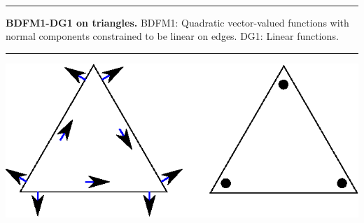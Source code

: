 \documentclass[landscape]{imposter}
\begin{document}
\begin{multicols*}{3}
\vspace{1cm} \\
\parbox{25cm}{\hrule height 0pt width 0pt {\bfseries BDFM1-DG1 on triangles.}  BDFM1: Quadratic vector-valued functions
    with normal components constrained to be linear on edges. DG1:
    Linear functions.}
\hspace{1cm}
\parbox{25cm}{\hrule height 0pt width 0pt
\includegraphics{BDFM1_DOFS}}\\



\small

\end{multicols*}
\end{document}
